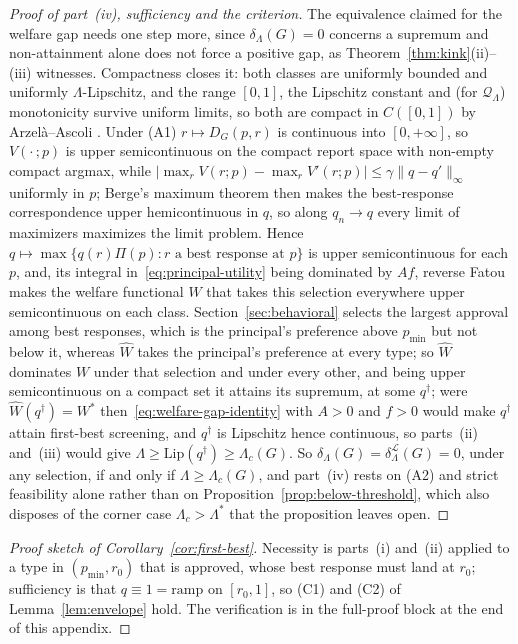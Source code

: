 \documentclass[acmsmall,nonacm,screen]{acmart}
\theoremstyle{acmplain}%
\theoremstyle{acmdefinition}%
\numberwithin{equation}{section}
\newcommand{\suppsec}[1]{the full-proof block at the end of this appendix}
\begin{document}
\begin{appendix}
\begin{proof}[Proof of part~(iv), sufficiency and the criterion]
The equivalence claimed for the welfare gap needs one step more, since $\delta_\Lambda(G)=0$ concerns a supremum and non-attainment alone does not force a positive gap, as Theorem~\ref{thm:kink}(ii)--(iii) witnesses. Compactness closes it: both classes are uniformly bounded and uniformly $\Lambda$-Lipschitz, and the range $[0,1]$, the Lipschitz constant and (for $\mathcal{Q}_\Lambda$) monotonicity survive uniform limits, so both are compact in $C([0,1])$ by Arzel\`a--Ascoli \citep[Thm.~3.85]{aliprantis2006infinite}. Under (A1) $r\mapsto D_G(p,r)$ is continuous into $[0,+\infty]$, so $V(\cdot\,;p)$ is upper semicontinuous on the compact report space with non-empty compact argmax, while $|\max_rV(r;p)-\max_rV'(r;p)|\leq\gamma\|q-q'\|_\infty$ uniformly in $p$; Berge's maximum theorem \citep[Thm.~17.31]{aliprantis2006infinite} then makes the best-response correspondence upper hemicontinuous in $q$, so along $q_n\to q$ every limit of maximizers maximizes the limit problem. Hence $q\mapsto\max\{q(r)\Pi(p):r\text{ a best response at }p\}$ is upper semicontinuous for each $p$, and, its integral in~\eqref{eq:principal-utility} being dominated by $Af$, reverse Fatou makes the welfare functional $\widehat W$ that takes this selection everywhere upper semicontinuous on each class. Section~\ref{sec:behavioral} selects the largest approval among best responses, which is the principal's preference above $p_{\min}$ but not below it, whereas $\widehat W$ takes the principal's preference at every type; so $\widehat W$ dominates $W$ under that selection and under every other, and being upper semicontinuous on a compact set it attains its supremum, at some $q^\dagger$; were $\widehat W(q^\dagger)=W^*$ then~\eqref{eq:welfare-gap-identity} with $A>0$ and $f>0$ would make $q^\dagger$ attain first-best screening, and $q^\dagger$ is Lipschitz hence continuous, so parts~(ii) and~(iii) would give $\Lambda\geq\mathrm{Lip}(q^\dagger)\geq\Lambda_c(G)$. So $\delta_\Lambda(G)=\delta^{\mathcal{L}}_\Lambda(G)=0$, under any selection, if and only if $\Lambda\geq\Lambda_c(G)$, and part~(iv) rests on (A2) and strict feasibility alone rather than on Proposition~\ref{prop:below-threshold}, which also disposes of the corner case $\Lambda_c>\Lambda^*$ that the proposition leaves open.
\end{proof}

\begin{proof}[Proof sketch of Corollary~\ref{cor:first-best}]
Necessity is parts~(i) and~(ii) applied to a type in $(p_{\min},r_0)$ that is approved, whose best response must land at $r_0$; sufficiency is that $q\equiv1=\mathrm{ramp}$ on $[r_0,1]$, so (C1) and (C2) of Lemma~\ref{lem:envelope} hold. The verification is in \suppsec{S.10}.
\end{proof}


\end{appendix}
\end{document}

